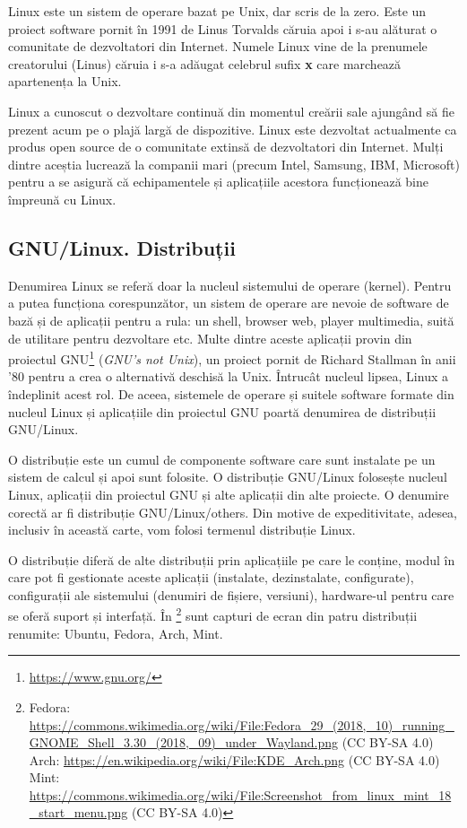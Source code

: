 Linux este un sistem de operare bazat pe Unix, dar scris de la zero.
Este un proiect software pornit în 1991 de Linus Torvalds căruia apoi i s-au alăturat o comunitate de dezvoltatori din Internet.
Numele Linux vine de la prenumele creatorului (Linus) căruia i s-a adăugat celebrul sufix \textbf{x} care marchează apartenența la Unix.

Linux a cunoscut o dezvoltare continuă din momentul creării sale ajungând să fie prezent acum pe o plajă largă de dispozitive.
Linux este dezvoltat actualmente ca produs open source de o comunitate extinsă de dezvoltatori din Internet.
Mulți dintre aceștia lucrează la companii mari (precum Intel, Samsung, IBM, Microsoft) pentru a se asigură că echipamentele și aplicațiile acestora funcționează bine împreună cu Linux.

\subsection{GNU/Linux. Distribuții}
\label{sec:intro:distros}

Denumirea Linux se referă doar la nucleul sistemului de operare (kernel).
Pentru a putea funcționa corespunzător, un sistem de operare are nevoie de software de bază și de aplicații pentru a rula: un shell, browser web, player multimedia, suită de utilitare pentru dezvoltare etc.
Multe dintre aceste aplicații provin din proiectul GNU\footnote{\url{https://www.gnu.org/}}  (\textit{GNU's not Unix}), un proiect pornit de Richard Stallman în anii '80 pentru a crea o alternativă deschisă la Unix.
Întrucât nucleul lipsea, Linux a îndeplinit acest rol.
De aceea, sistemele de operare și suitele software formate din nucleul Linux și aplicațiile din proiectul GNU poartă denumirea de distribuții GNU/Linux.

O distribuție este un cumul de componente software care sunt instalate pe un sistem de calcul și apoi sunt folosite.
O distribuție GNU/Linux folosește nucleul Linux, aplicații din proiectul GNU și alte aplicații din alte proiecte.
O denumire corectă ar fi distribuție GNU/Linux/others.
Din motive de expeditivitate, adesea, inclusiv în această carte, vom folosi termenul distribuție Linux.

O distribuție diferă de alte distribuții prin aplicațiile pe care le conține, modul în care pot fi gestionate aceste aplicații (instalate, dezinstalate, configurate), configurații ale sistemului (denumiri de fișiere, versiuni), hardware-ul pentru care se oferă suport și interfață.
În \footnote{Fedora: \url{https://commons.wikimedia.org/wiki/File:Fedora_29_(2018,_10)_running_GNOME_Shell_3.30_(2018,_09)_under_Wayland.png} (CC BY-SA 4.0)\\Arch: \url{https://en.wikipedia.org/wiki/File:KDE_Arch.png} (CC BY-SA 4.0)\\Mint: \url{https://commons.wikimedia.org/wiki/File:Screenshot_from_linux_mint_18_start_menu.png} (CC BY-SA 4.0)} sunt capturi de ecran din patru distribuții renumite: Ubuntu, Fedora, Arch, Mint.

